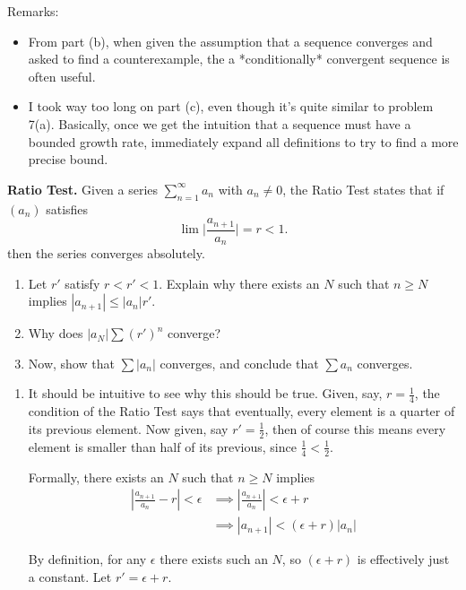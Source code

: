 \documentclass{oxmathproblems}
\begin{document}
\begin{questions}
\begin{solution}
  Remarks:
  \begin{itemize}
    \item From part (b), when given the assumption that a sequence converges and asked to find a counterexample, the a *conditionally* convergent sequence is often useful.
    \item I took way too long on part (c), even though it's quite similar to problem 7(a). Basically, once we get the intuition that a sequence must have a bounded growth rate, immediately
    expand all definitions to try to find a more precise bound.
  \end{itemize}
\end{solution}

\miquestion \textbf{Ratio Test.} Given a series $\sum_{n=1}^{\infty} a_{n}$ with $a_{n} \neq 0$, the Ratio Test states that if $(a_{n})$ satisfies
\[\lim\lvert \frac{a_{n+1}}{a_{n}} \rvert = r < 1.\]
then the series converges absolutely.
\begin{enumerate}[label=(\alph*)]
  \item Let $r'$ satisfy $r < r' < 1$. Explain why there exists an $N$ such that $n \geq N$ implies $|a_{n+1}| \leq |a_{n}|r'$.
  \item Why does $|a_{N}|\sum(r')^{n}$ converge?
  \item Now, show that $\sum |a_{n}|$ converges, and conclude that $\sum a_{n}$ converges.
\end{enumerate}

\begin{solution}
  \begin{enumerate}[label=(\alph*)]
    \item It should be intuitive to see why this should be true. Given, say, $r=\frac{1}{4}$, the condition of the Ratio Test says that eventually, every element is a quarter of its
    previous element. Now given, say $r' = \frac{1}{2}$, then of course this means every element is smaller than half of its previous, since $\frac{1}{4} < \frac{1}{2}$.

    Formally, there exists an $N$ such that $n \geq N$ implies
    \begin{align*}
      \left|\frac{a_{n+1}}{a_{n}} - r\right| < \epsilon
      &\implies \left|\frac{a_{n+1}}{a_{n}}\right| < \epsilon + r \\
      &\implies |a_{n+1}| < (\epsilon + r) |a_{n}|
    \end{align*}

    By definition, for any $\epsilon$ there exists such an $N$, so $(\epsilon + r)$ is effectively just a constant. Let $r' = \epsilon + r$.


\end{enumerate}
\end{solution}
\end{questions}
\end{document}
